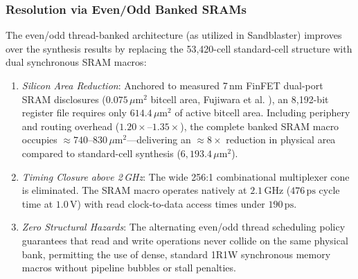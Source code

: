 \subsubsection{Resolution via Even/Odd Banked SRAMs}
The even/odd thread-banked architecture (as utilized in Sandblaster) improves over the synthesis results by replacing the 53,420-cell standard-cell structure with dual synchronous SRAM macros:
\begin{enumerate}
    \item \textit{Silicon Area Reduction}: Anchored to measured 7\,nm FinFET dual-port SRAM disclosures ($0.075\,\mu\text{m}^2$ bitcell area, Fujiwara et al. \cite{fujiwara2019sram}), an 8,192-bit register file requires only $614.4\,\mu\text{m}^2$ of active bitcell area. Including periphery and routing overhead ($1.20\times\text{--}1.35\times$), the complete banked SRAM macro occupies $\approx 740\text{--}830\,\mu\text{m}^2$---delivering an $\approx 8\times$ reduction in physical area compared to standard-cell synthesis ($6,193.4\,\mu\text{m}^2$).
    
    \item \textit{Timing Closure above 2\,GHz}: The wide 256:1 combinational multiplexer cone is eliminated. The SRAM macro operates natively at $2.1\,\text{GHz}$ ($476\,\text{ps}$ cycle time at $1.0\,\text{V}$) with read clock-to-data access times under $190\,\text{ps}$.
    
    \item \textit{Zero Structural Hazards}: The alternating even/odd thread scheduling policy guarantees that read and write operations never collide on the same physical bank, permitting the use of dense, standard 1R1W synchronous memory macros without pipeline bubbles or stall penalties.
\end{enumerate}


